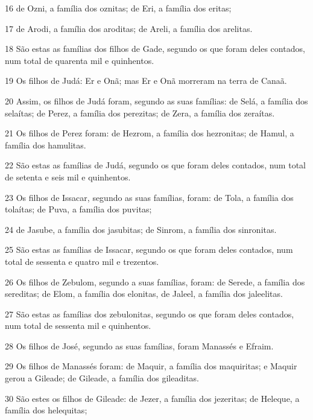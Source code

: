 \par 16 de Ozni, a família dos oznitas; de Eri, a família dos eritas;
\par 17 de Arodi, a família dos aroditas; de Areli, a família dos arelitas.
\par 18 São estas as famílias dos filhos de Gade, segundo os que foram deles contados, num total de quarenta mil e quinhentos.
\par 19 Os filhos de Judá: Er e Onã; mas Er e Onã morreram na terra de Canaã.
\par 20 Assim, os filhos de Judá foram, segundo as suas famílias: de Selá, a família dos selaítas; de Perez, a família dos perezitas; de Zera, a família dos zeraítas.
\par 21 Os filhos de Perez foram: de Hezrom, a família dos hezronitas; de Hamul, a família dos hamulitas.
\par 22 São estas as famílias de Judá, segundo os que foram deles contados, num total de setenta e seis mil e quinhentos.
\par 23 Os filhos de Issacar, segundo as suas famílias, foram: de Tola, a família dos tolaítas; de Puva, a família dos puvitas;
\par 24 de Jasube, a família dos jasubitas; de Sinrom, a família dos sinronitas.
\par 25 São estas as famílias de Issacar, segundo os que foram deles contados, num total de sessenta e quatro mil e trezentos.
\par 26 Os filhos de Zebulom, segundo a suas famílias, foram: de Serede, a família dos sereditas; de Elom, a família dos elonitas, de Jaleel, a família dos jaleelitas.
\par 27 São estas as famílias dos zebulonitas, segundo os que foram deles contados, num total de sessenta mil e quinhentos.
\par 28 Os filhos de José, segundo as suas famílias, foram Manassés e Efraim.
\par 29 Os filhos de Manassés foram: de Maquir, a família dos maquiritas; e Maquir gerou a Gileade; de Gileade, a família dos gileaditas.
\par 30 São estes os filhos de Gileade: de Jezer, a família dos jezeritas; de Heleque, a família dos helequitas;
\par 31 de Asriel, a família dos asrielitas; de Siquém, a família dos siquemitas.
\par 32 De Semida, a família dos semidaítas; de Héfer, a família dos heferitas.
\par 33 Porém Zelofeade, filho de Héfer, não tinha filhos, senão filhas; os nomes das filhas de Zelofeade foram: Macla, Noa, Hogla, Milca e Tirza.
